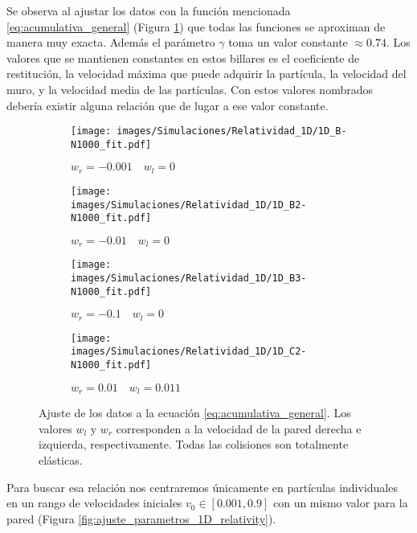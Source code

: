 \vspace{3mm}

Se observa al ajustar los datos con la función mencionada \ref{eq:acumulativa_general} (Figura \ref{fig:ajuste_1D_relativity}) que todas las funciones se aproximan de manera muy exacta. Además el parámetro \( \gamma \) toma un valor constante \( \approx 0.74 \). Los valores que se mantienen constantes en estos billares es el coeficiente de restitución, la velocidad máxima que puede adquirir la partícula, la velocidad del muro, y la velocidad media de las partículas. Con estos valores nombrados debería existir alguna relación que de lugar a ese valor constante. 

\begin{figure}[h]
    \begin{subfigure}[b]{0.5\textwidth}
        \centering
        \texttt{[image: images/Simulaciones/Relatividad\_1D/1D\_B-N1000\_fit.pdf]}
        \caption{$w_r = -0.001 \quad w_l = 0$}
    \end{subfigure}
    \hfill
    \begin{subfigure}[b]{0.5\textwidth}
        \centering
        \texttt{[image: images/Simulaciones/Relatividad\_1D/1D\_B2-N1000\_fit.pdf]}
        \caption{$w_r = -0.01 \quad w_l = 0$}
    \end{subfigure}
    \hfill
    \begin{subfigure}[b]{0.5\textwidth}
        \centering
        \texttt{[image: images/Simulaciones/Relatividad\_1D/1D\_B3-N1000\_fit.pdf]}
        \caption{$w_r = -0.1 \quad w_l = 0$}
    \end{subfigure}
    \hfill
    \begin{subfigure}[b]{0.5\textwidth}
        \centering
        \texttt{[image: images/Simulaciones/Relatividad\_1D/1D\_C2-N1000\_fit.pdf]}
        \caption{$w_r = 0.01 \quad w_l = 0.011$}
    \end{subfigure}
    \caption{Ajuste de los datos a la ecuación \ref{eq:acumulativa_general}. Los valores \( w_l \) y \( w_r \) corresponden a la velocidad de la pared derecha e izquierda, respectivamente. Todas las colisiones son totalmente elásticas.}
    \label{fig:ajuste_1D_relativity}
\end{figure}

Para buscar esa relación nos centraremos únicamente en partículas individuales en un rango de velocidades iniciales \( v_0 \in [0.001, 0.9] \) con un mismo valor para la pared (Figura \ref{fig:ajuste_parametros_1D_relativity}). 

